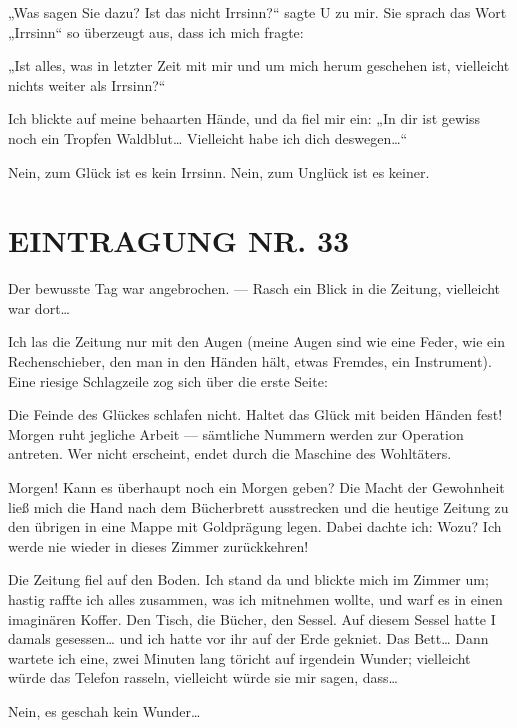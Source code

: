 „Was sagen Sie dazu? Ist das nicht Irrsinn?“ sagte U zu mir. Sie
sprach das Wort „Irrsinn“ so überzeugt aus, dass ich mich fragte:

„Ist alles, was in letzter Zeit mit mir und um mich herum geschehen
ist, vielleicht nichts weiter als Irrsinn?“

Ich blickte auf meine
behaarten Hände, und da fiel mir ein: „In dir ist gewiss noch ein
Tropfen Waldblut\ldots{} Vielleicht habe ich dich deswegen\ldots{}“

Nein,
zum Glück ist es kein Irrsinn. Nein, zum Unglück ist es keiner.

\section{EINTRAGUNG NR. 33}

Der bewusste Tag war angebrochen. —
%
Rasch ein Blick in die Zeitung, vielleicht war dort\ldots{}

Ich las die Zeitung nur mit den Augen (meine
Augen sind wie eine Feder, wie ein Rechenschieber, den man in den
Händen hält, etwas Fremdes, ein Instrument).
%
Eine riesige
Schlagzeile zog sich über die erste Seite:

\begin{meldung}
Die Feinde des Glückes
schlafen nicht. Haltet das Glück mit beiden Händen fest! Morgen
ruht jegliche Arbeit — sämtliche Nummern werden zur Operation
antreten. Wer nicht erscheint, endet durch die Maschine des
Wohltäters.
\end{meldung}

Morgen! Kann es überhaupt noch ein Morgen geben? Die
Macht der Gewohnheit ließ mich die Hand nach dem Bücherbrett
ausstrecken und die heutige Zeitung zu den übrigen in eine Mappe
mit Goldprägung legen. Dabei dachte ich: Wozu? Ich werde nie wieder
in dieses Zimmer zurückkehren!

Die Zeitung fiel auf den Boden. Ich stand da und blickte mich im
Zimmer um; hastig raffte ich alles zusammen, was ich mitnehmen
wollte, und warf es in einen imaginären Koffer. Den Tisch, die
Bücher, den Sessel. Auf diesem Sessel hatte I damals gesessen\ldots{}
und ich hatte vor ihr auf der Erde gekniet. Das Bett\ldots{} Dann
wartete ich eine, zwei Minuten lang töricht auf irgendein Wunder;
vielleicht würde das Telefon rasseln, vielleicht würde sie mir
sagen, dass\ldots{}

Nein, es geschah kein Wunder\ldots{}

